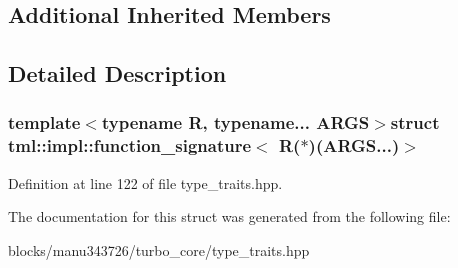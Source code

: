 \subsection*{Additional Inherited Members}


\subsection{Detailed Description}
\subsubsection*{template$<$typename R, typename... A\+R\+G\+S$>$struct tml\+::impl\+::function\+\_\+signature$<$ R($\ast$)(\+A\+R\+G\+S...)$>$}



Definition at line 122 of file type\+\_\+traits.\+hpp.



The documentation for this struct was generated from the following file\+:\begin{DoxyCompactItemize}
\item 
blocks/manu343726/turbo\+\_\+core/type\+\_\+traits.\+hpp\end{DoxyCompactItemize}
